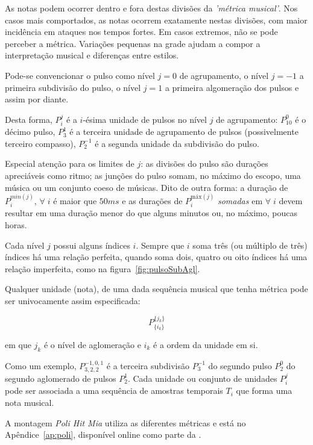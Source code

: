 As notas podem ocorrer dentro e fora destas divisões da \emph{'métrica musical'}. Nos casos mais comportados, as notas ocorrem exatamente nestas divisões, com maior incidência em ataques nos tempos fortes.
Em casos extremos, não se pode perceber a métrica.\cite{Roederer} Variações pequenas na grade ajudam a compor a interpretação musical e diferenças entre estilos.\cite{Cook}

Pode-se convencionar
o pulso como nível $j=0$ de agrupamento, o nível $j=-1$ 
a primeira subdivisão do pulso, o nível $j=1$ a primeira algomeração dos pulsos e assim por diante. 

Desta forma, $P_i^j$ é a $i$-ésima unidade de 
pulsos no nível $j$ de agrupamento:
$P^0_{10}$ é o décimo pulso, $P^{1}_3$ é a terceira unidade de agrupamento de pulsos (possivelmente terceiro compasso),
$P^{-1}_2$ é a segunda unidade da subdivisão do pulso.

Especial atenção para
os limites de $j$: as divisões do pulso são durações apreciáveis
como ritmo; as junções do pulso somam, no máximo
do escopo, uma música ou um conjunto coeso de músicas. Dito de outra forma: a duração de $P^{min(j)}_i$, $\forall \; i$
é maior que $50ms$ e as durações de $P^{\text{máx}(j)}_i$ \emph{somadas}  em $\forall \; i$
devem resultar em uma duração menor do que alguns minutos ou, no máximo, poucas horas.


Cada nível $j$ possui alguns índices $i$. Sempre que $i$ soma três 
(ou múltiplo de três) índices há uma relação perfeita, 
quando soma dois, quatro ou oito índices há uma relação imperfeita, como na figura~\ref{fig:pulsoSubAgl}.


Qualquer unidade (nota), de uma
dada sequência musical que tenha métrica pode ser
univocamente assim especificada:

\begin{equation}
P^{ \{ j_k \} }_{ \{ i_{k} \}}
\end{equation}

em que $j_k$ é o nível de aglomeração e $i_k$ é a ordem
da unidade em si.

Como um exemplo, $P^{-1,0,1}_{3,2,2}$  é a terceira subdivisão $P^{-1}_3$ do segundo
pulso $P^0_2$ do segundo aglomerado de pulsos $P^1_2$.
Cada unidade ou conjunto de unidades $P_i^j$ pode ser associada a uma sequência de amostras temporais $T_i$ que forma uma nota musical. 

A montagem \emph{Poli Hit Mia} utiliza as diferentes métricas e está no Apêndice~\ref{ap:poli}, disponível online como parte da \massa.

